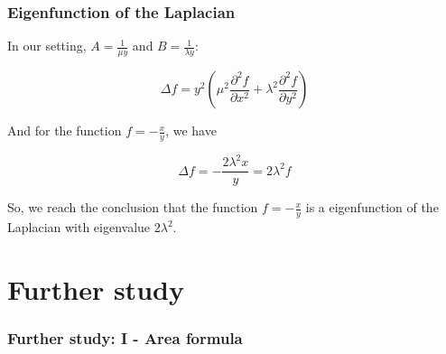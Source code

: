 \documentclass[aspectratio=169]{beamer}
\begin{document}
\begin{frame}
    \frametitle{Eigenfunction of the Laplacian}
    In our setting, \(A = \frac{1}{\mu y}\) and \(B = \frac{1}{\lambda y}\):

    \[
        \Delta f = y^2 \left(\mu^2 \frac{\partial^2 f}{\partial x^2} + \lambda^2 \frac{\partial^2 f}{\partial y^2}\right)
    \]

    And for the function \(f = - \frac{x}{y}\), we have

    \[
        \Delta f = - \frac{2 \lambda^2 x}{y} = 2 \lambda^2 f
    \]

    So, we reach the conclusion that the function \(f = - \frac{x}{y}\) is a eigenfunction of the Laplacian with eigenvalue \(2 \lambda^2\).\end{frame}
\section{Further study}

\begin{frame}
    \frametitle{Further study: I - Area formula}
    \begin{figure}[ht]\centering
    \end{figure}
\end{frame}
\end{document}
